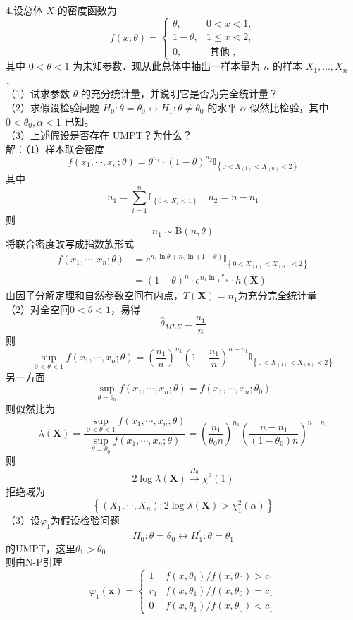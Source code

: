 \documentclass[UTF8,openany]{book}
\begin{document}
	\noindent 4.设总体 $X$ 的密度函数为
	$$
	f(x ; \theta)= \begin{cases}\theta, & 0<x<1, \\ 1-\theta, & 1 \leq x<2, \\ 0, & \text { 其他 },\end{cases}
	$$
	其中 $0<\theta<1$ 为未知参数．现从此总体中抽出一样本量为 $n$ 的样本 $X_1, \ldots, X_n$ ．\\
	（1）试求参数 $\theta$ 的充分统计量，并说明它是否为完全统计量？\\
	（2）求假设检验问题 $H_0: \theta=\theta_0 \leftrightarrow H_1: \theta \neq \theta_0$ 的水平 $\alpha$ 似然比检验，其中 $0<\theta_0, \alpha<1$ 已知。\\
	（3）上述假设是否存在 UMPT？为什么？\\
	解：（1）样本联合密度
	\[
	f(x_1,\cdots,x_n;\theta)=\theta^{n_1}\cdot (1-\theta)^{n_2}\mathbb{I}_{\left\{0<X_{(1)}<X_{(n)}<2\right\}}
	\]
	其中
	\[
	n_1=\sum_{i=1}^{n} \mathbb{I}_{\left\{0<X_i<1 \right\}}\quad n_2=n-n_1
	\]
	则
	\[
	n_1\sim \mathrm{B}(n,\theta)
	\]
	将联合密度改写成指数族形式
	\begin{align*}
		f(x_1,\cdots,x_n;\theta)&=e^{n_1\ln \theta +n_2\ln (1-\theta)}\mathbb{I}_{\left\{0<X_{(1)}<X_{(n)}<2\right\}}  \\
		& =(1-\theta)^n \cdot e^{n_1\ln \frac{\theta}{1-\theta}}\cdot h(\boldsymbol{X})
	\end{align*}
	由因子分解定理和自然参数空间有内点，$T(\boldsymbol{X})=n_1$为充分完全统计量\\
	（2）对全空间$0<\theta<1$，易得
	\[
	\hat{\theta}_{MLE}=\frac{n_1}{n}
	\]
	则
	\[
	\sup\limits_{0<\theta<1} f(x_1,\cdots,x_n;\theta) = \left(\frac{n_1}{n}\right)^{n_1}\left(1-\frac{n_1}{n}\right)^{n-n_1}\mathbb{I}_{\left\{0<X_{(1)}<X_{(n)}<2\right\}}
	\]
	另一方面
	\[
	\sup\limits_{\theta=\theta_0} f(x_1,\cdots,x_n;\theta)=f(x_1,\cdots,x_n;\theta_0)
	\]
	则似然比为
	\[
	\lambda(\boldsymbol{X})=\frac{\sup\limits_{0<\theta<1} f(x_1,\cdots,x_n;\theta)}{\sup\limits_{\theta=\theta_0} f(x_1,\cdots,x_n;\theta)}=\left(\frac{n_1}{\theta_0 n}\right)^{n_1}\left(\frac{n-n_1}{\left(1-\theta_0\right) n}\right)^{n-n_1}
	\]
	则
	\[
	2\log \lambda(\boldsymbol{X})\xrightarrow{H_0}\chi^2(1)
	\]
	拒绝域为
	\[
	\left\{(X_1,\cdots,X_n):2\log \lambda(\boldsymbol{X})>\chi^2_1(\alpha) \right\}
	\]
	（3）设$\varphi_1$为假设检验问题
	\[
	H_0:\theta=\theta_0 \leftrightarrow H_1^{\prime}:\theta=\theta_1
	\]
	的UMPT，这里$\theta_1>\theta_0$\\
	则由N-P引理
	\[
	\varphi_1(\boldsymbol{x})= 
	\begin{cases}
		1 & f\left(x, \theta_1\right) / f\left(x, \theta_0\right)>c_1 \\ 
		r_1 & f\left( x, \theta_1 \right) /f\left(x, \theta_0\right)=c_1 \\ 
		0 & f\left(x, \theta_1\right) / f\left(x, \theta_0\right) <c_1
	\end{cases}
	\]
\end{document}
